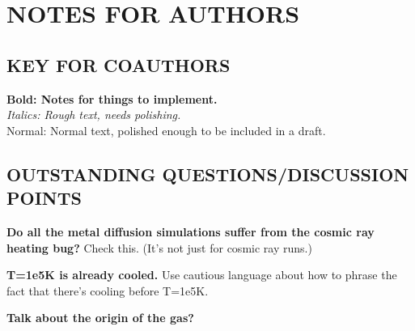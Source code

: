 \documentclass[fleqn,usenatbib]{mnras}
\begin{document}


\section{NOTES FOR AUTHORS}

\subsection{KEY FOR COAUTHORS}
\textbf{Bold: Notes for things to implement.} \\
\textit{Italics: Rough text, needs polishing.} \\
Normal: Normal text, polished enough to be included in a draft.

\subsection{OUTSTANDING QUESTIONS/DISCUSSION POINTS}

\textbf{Do all the metal diffusion simulations suffer from the cosmic ray heating bug?}
Check this. (It's not just for cosmic ray runs.)

\textbf{T=1e5K is already cooled.}
Use cautious language about how to phrase the fact that there's cooling before T=1e5K.

\textbf{Talk about the origin of the gas?}
\end{document}
